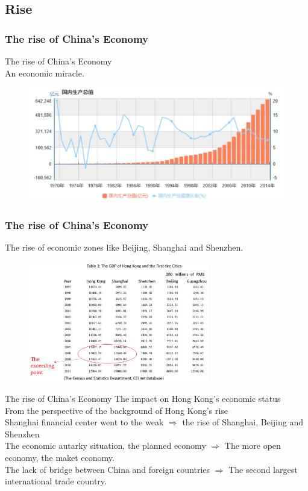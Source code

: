 \documentclass[slidestop,uncompress,mathsans, 12pt]{beamer}
\begin{document}
\subsection{Rise}
\begin{frame}
\frametitle{The rise of China's Economy}
The rise of China's Economy\\
An economic miracle.\\
\bigskip
\begin{figure}[h!]
\centering
\includegraphics[width=1\textwidth]{hk8.jpg}
\label{threadsVsSync}
\end{figure}
\end{frame}



\begin{frame}
\frametitle{The rise of China's Economy}
The rise of economic zones like Beijing, Shanghai and    Shenzhen. \\
\begin{figure}[h!]
\centering
\includegraphics[width=0.7\textwidth]{hk8.png}
\label{threadsVsSync}
\end{figure}
\end{frame}
\begin{frame}{The rise of China's Economy}
The impact on Hong Kong's economic status\\
\bigskip
From the perspective of the background of Hong Kong's rise\\
\bigskip
\bigskip
Shanghai financial center went to the weak
$\Longrightarrow$ the rise of Shanghai, Beijing and Shenzhen\\
\bigskip
\bigskip
The economic autarky situation, the planned economy
$\Longrightarrow$ The more open economy, the maket economy.\\
\bigskip
\bigskip
The lack of bridge between China and foreign countries
$\Longrightarrow$ The second largest international trade country.\\
 



\end{frame}
\end{document}
